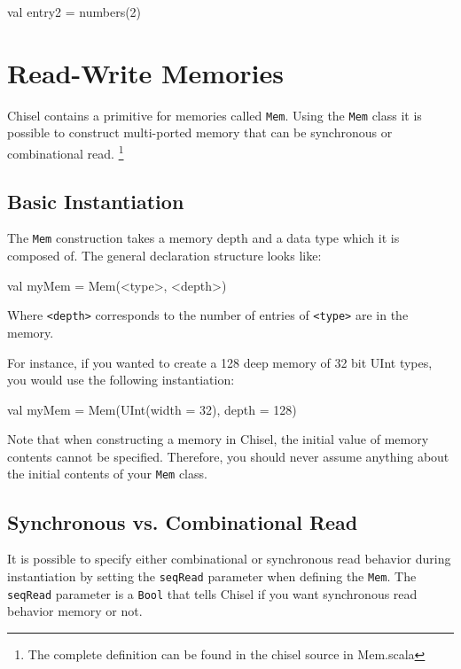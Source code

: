 \documentclass[twocolumn, 10pt]{article}
\begin{document}
\begin{scala}
val entry2 = numbers(2)
\end{scala}

\section{Read-Write Memories}

Chisel contains a primitive for memories called \verb+Mem+. Using the \verb+Mem+ class it is possible to construct multi-ported memory that can be synchronous or combinational read. \footnote{The complete definition can be found in the chisel source in  Mem.scala}

\subsection{Basic Instantiation}

The \verb+Mem+ construction takes a memory depth and a data type which it is composed of. The general declaration structure looks like:

\begin{scala}
val myMem = Mem(<type>, <depth>)
\end{scala}

Where \verb+<depth>+ corresponds to the number of entries of \verb+<type>+ are in the memory.

For instance, if you wanted to create a 128 deep memory of 32 bit UInt types, you would use the following instantiation:

\begin{scala}
val myMem = Mem(UInt(width = 32), depth = 128)
\end{scala}

Note that when constructing a memory in Chisel, the initial value of memory contents cannot be specified. Therefore, you should never assume anything about the initial contents of your \verb+Mem+ class.

\subsection{Synchronous vs. Combinational Read}

It is possible to specify either combinational or synchronous read behavior during instantiation by setting the \verb+seqRead+ parameter when defining the \verb+Mem+. The \verb+seqRead+ parameter is a \verb+Bool+ that tells Chisel if you want synchronous read behavior memory or not.
\end{document}

